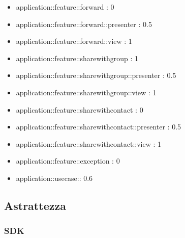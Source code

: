 \begin{itemize}
\item application::feature::forward : 0
\item application::feature::forward::presenter : 0.5
\item application::feature::forward::view : 1
\item application::feature::sharewithgroup : 1
\item application::feature::sharewithgroup::presenter : 0.5
\item application::feature::sharewithgroup::view : 1
\item application::feature::sharewithcontact : 0
\item application::feature::sharewithcontact::presenter : 0.5
\item application::feature::sharewithcontact::view : 1
\item application::feature::exception : 0
\item application::usecase:: 0.6

\end{itemize}


\subsection{Astrattezza}

\subsubsection{SDK}

